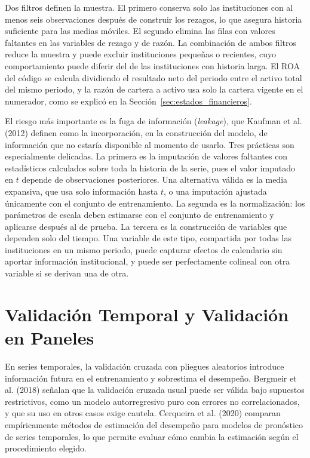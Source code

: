 Dos filtros definen la muestra. El primero conserva solo las instituciones con al menos seis observaciones después de construir los rezagos, lo que asegura historia suficiente para las medias móviles. El segundo elimina las filas con valores faltantes en las variables de rezago y de razón. La combinación de ambos filtros reduce la muestra y puede excluir instituciones pequeñas o recientes, cuyo comportamiento puede diferir del de las instituciones con historia larga. El ROA del código se calcula dividiendo el resultado neto del periodo entre el activo total del mismo periodo, y la razón de cartera a activo usa solo la cartera vigente en el numerador, como se explicó en la Sección~\ref{sec:estados_financieros}.

El riesgo más importante es la fuga de información (\textit{leakage}), que Kaufman et al. (2012) definen como la incorporación, en la construcción del modelo, de información que no estaría disponible al momento de usarlo. Tres prácticas son especialmente delicadas. La primera es la imputación de valores faltantes con estadísticos calculados sobre toda la historia de la serie, pues el valor imputado en $t$ depende de observaciones posteriores. Una alternativa válida es la media expansiva, que usa solo información hasta $t$, o una imputación ajustada únicamente con el conjunto de entrenamiento. La segunda es la normalización: los parámetros de escala deben estimarse con el conjunto de entrenamiento y aplicarse después al de prueba. La tercera es la construcción de variables que dependen solo del tiempo. Una variable de este tipo, compartida por todas las instituciones en un mismo periodo, puede capturar efectos de calendario sin aportar información institucional, y puede ser perfectamente colineal con otra variable si se derivan una de otra.

\section{Validación Temporal y Validación en Paneles}\label{sec:val_temporal}

En series temporales, la validación cruzada con pliegues aleatorios introduce información futura en el entrenamiento y sobrestima el desempeño. Bergmeir et al. (2018) señalan que la validación cruzada usual puede ser válida bajo supuestos restrictivos, como un modelo autorregresivo puro con errores no correlacionados, y que su uso en otros casos exige cautela. Cerqueira et al. (2020) comparan empíricamente métodos de estimación del desempeño para modelos de pronóstico de series temporales, lo que permite evaluar cómo cambia la estimación según el procedimiento elegido.

